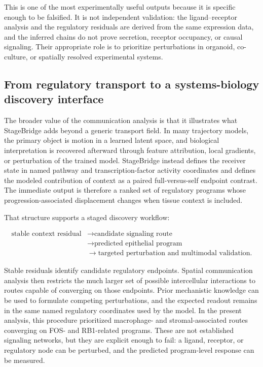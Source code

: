 This is one of the most experimentally useful outputs because it is specific enough to be falsified. It is not independent validation: the ligand--receptor analysis and the regulatory residuals are derived from the same expression data, and the inferred chains do not prove secretion, receptor occupancy, or causal signaling. Their appropriate role is to prioritize perturbations in organoid, co-culture, or spatially resolved experimental systems.

\subsection{From regulatory transport to a systems-biology discovery interface}
\label{sec:discovery-engine}

The broader value of the communication analysis is that it illustrates what StageBridge adds beyond a generic transport field. In many trajectory models, the primary object is motion in a learned latent space, and biological interpretation is recovered afterward through feature attribution, local gradients, or perturbation of the trained model. StageBridge instead defines the receiver state in named pathway and transcription-factor activity coordinates and defines the modeled contribution of context as a paired full-versus-self endpoint contrast. The immediate output is therefore a ranked set of regulatory programs whose progression-associated displacement changes when tissue context is included.

That structure supports a staged discovery workflow:

\begin{equation}
\begin{aligned}
\text{stable context residual}
&\rightarrow \text{candidate signaling route} \\
&\rightarrow \text{predicted epithelial program} \\
&\rightarrow \text{targeted perturbation and multimodal validation}.
\end{aligned}
\end{equation}

Stable residuals identify candidate regulatory endpoints. Spatial communication analysis then restricts the much larger set of possible intercellular interactions to routes capable of converging on those endpoints. Prior mechanistic knowledge can be used to formulate competing perturbations, and the expected readout remains in the same named regulatory coordinates used by the model. In the present analysis, this procedure prioritized macrophage- and stromal-associated routes converging on FOS- and RB1-related programs. These are not established signaling networks, but they are explicit enough to fail: a ligand, receptor, or regulatory node can be perturbed, and the predicted program-level response can be measured.

